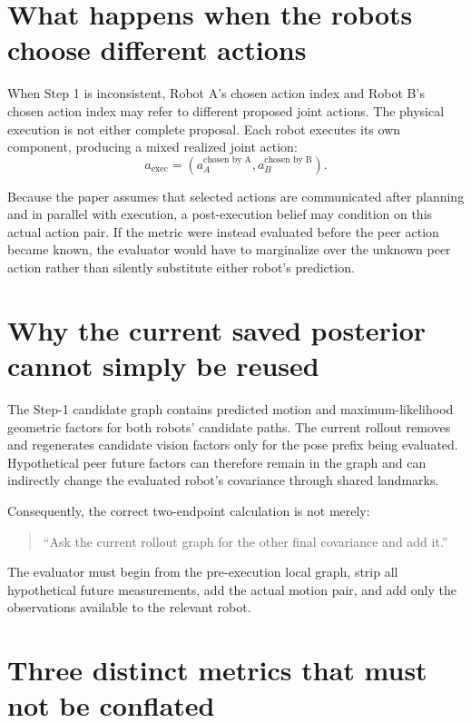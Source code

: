 \documentclass[11pt,a4paper]{article}
\begin{document}
\section{What happens when the robots choose different actions}

When Step 1 is inconsistent, Robot A's chosen action index and Robot B's chosen
action index may refer to different proposed joint actions.  The physical
execution is not either complete proposal.  Each robot executes its own
component, producing a mixed realized joint action:
\[
  a_{\mathrm{exec}}
  =\left(a_A^{\text{chosen by A}},
          a_B^{\text{chosen by B}}\right).
\]

Because the paper assumes that selected actions are communicated after
planning and in parallel with execution, a post-execution belief may condition
on this actual action pair.  If the metric were instead evaluated before the
peer action became known, the evaluator would have to marginalize over the
unknown peer action rather than silently substitute either robot's prediction.

\section{Why the current saved posterior cannot simply be reused}

The Step-1 candidate graph contains predicted motion and maximum-likelihood
geometric factors for both robots' candidate paths.  The current rollout
removes and regenerates candidate vision factors only for the pose prefix being
evaluated.  Hypothetical peer future factors can therefore remain in the graph
and can indirectly change the evaluated robot's covariance through shared
landmarks.

Consequently, the correct two-endpoint calculation is not merely:
\begin{quote}
``Ask the current rollout graph for the other final covariance and add it.''
\end{quote}
The evaluator must begin from the pre-execution local graph, strip all
hypothetical future measurements, add the actual motion pair, and add only the
observations available to the relevant robot.

\section{Three distinct metrics that must not be conflated}
\end{document}
